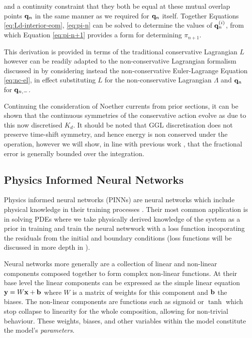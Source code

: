 and a continuity constraint that they both be equal at these mutual overlap points $\vb{q}_n$ in the same manner as we required for $\vb{q}_n$ itself. Together Equations \eqref{eq:Ld-interior-eom}, \eqref{eq:pi-n} can be solved to determine the values of $\vb q^{(i)}_n$, from which Equation \eqref{eq:pi-n+1} provides a form for determining $\pi_{n + 1}$.

This derivation is provided in terms of the traditional conservative Lagrangian $L$ however can be readily adapted to the non-conservative Lagrangian formalism discussed in  by considering instead the non-conservative Euler-Lagrange Equation \eqref{eq:nc-el}, in effect substituting $L$ for the non-conservative Lagrangian $\Lambda$ and $\vb q_n$ for $\vb q_{n, -}$.

Continuing the consideration of Noether currents from prior sections, it can be shown that the continuous symmetries of the conservative action evolve as due to this now discretised $K_d$. It should be noted that GGL discretisation does not preserve time-shift symmetry, and hence energy is non conserved under the operation, however we will show, in line with previous work \cite{tsangSLIMPLECTICINTEGRATORSVARIATIONAL2015}, that the fractional error is generally bounded over the integration.

\subsection{Physics Informed Neural Networks}
\label{sec:intro-pinn}

Physics informed neural networks (PINNs) are neural networks which include physical knowledge in their training processes \cite{raissiPhysicsInformedDeep2017}.
Their most common application is in solving PDEs \cite{luDeepXDEDeepLearning2021,mengCompositeNeuralNetwork2020} where we take physically derived knowledge of the system as a prior in training and train the neural netwwork with a loss function incoporating the residuals from the initial and boundary conditions (loss functions will be discussed in more depth in ).

Neural networks more generally are a collection of linear and non-linear components composed together to form complex non-linear functions. At their base level the linear components can be expressed as the simple linear equation \(\vb{y} = W\vb{x} + \vb{b}\) where $W$ is a matrix of weights for this component and $\vb{b}$ the biases. The non-linear components are functions such as sigmoid or $\tanh$ which stop collapse to linearity for the whole composition, allowing for non-trivial behaviour. These weights, biases, and other variables within the model constitute the model's \emph{parameters}.

